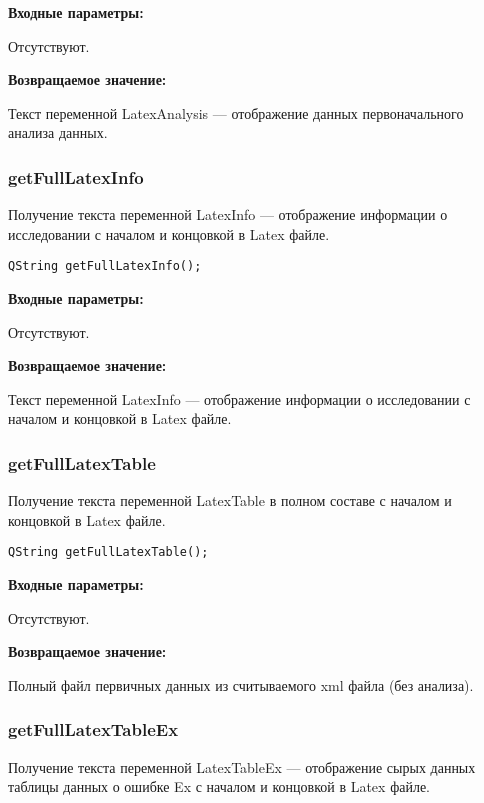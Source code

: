 \textbf{Входные параметры:}

Отсутствуют.

\textbf{Возвращаемое значение:}

Текст переменной LatexAnalysis --- отображение данных первоначального анализа данных.


\subsubsection{getFullLatexInfo}\label{getFullLatexInfo}

Получение текста переменной LatexInfo --- отображение информации о исследовании с началом и концовкой в Latex файле.


\begin{lstlisting}[label=code_syntax_getFullLatexInfo,caption=Синтаксис]
QString getFullLatexInfo();
\end{lstlisting}

\textbf{Входные параметры:}

Отсутствуют.

\textbf{Возвращаемое значение:}

Текст переменной LatexInfo --- отображение информации о исследовании с началом и концовкой в Latex файле.


\subsubsection{getFullLatexTable}\label{getFullLatexTable}

Получение текста переменной LatexTable в полном составе с началом и концовкой в Latex файле.


\begin{lstlisting}[label=code_syntax_getFullLatexTable,caption=Синтаксис]
QString getFullLatexTable();
\end{lstlisting}

\textbf{Входные параметры:}

Отсутствуют.

\textbf{Возвращаемое значение:}

Полный файл первичных данных из считываемого xml файла (без анализа).


\subsubsection{getFullLatexTableEx}\label{getFullLatexTableEx}

Получение текста переменной LatexTableEx --- отображение сырых данных таблицы данных о ошибке Ex с началом и концовкой в Latex файле.


